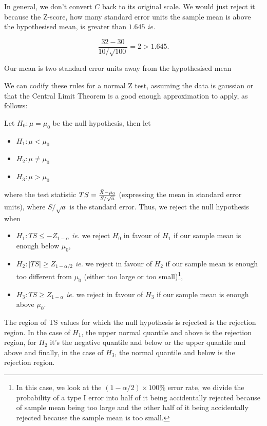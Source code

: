 \documentclass{homework}
\begin{document}
In general, we don't convert $C$ back to its original scale. We would just reject it because the Z-score, how many standard error units the sample mean is above the hypothesised mean, is greater than $1.645$ \textit{ie. }

$$
\frac{32-30}{10/\sqrt{100}} = 2 > 1.645.
$$

Our mean is two standard error units away from the hypothesised mean 

We can codify these rules for a normal Z test, assuming the data is gaussian or that the Central Limit Theorem is a good enough approximation to apply, as follows:

Let $H_0 : \mu = \mu_0$ be the null hypothesis, then let 
\begin{itemize}
    \item $H_1: \mu < \mu_0$
    \item $H_2: \mu \neq \mu_0$
    \item $H_3: \mu > \mu_0$
\end{itemize}

where the test statistic $TS = \frac{\Bar{X}-\mu_0}{S/\sqrt{a}}$ (expressing the mean in standard error units), where $S/\sqrt{a}$ is the standard error. Thus, we reject the null hypothesis when 

\begin{itemize}
\item $H_1: TS \leq -Z_{1-\alpha}$ \textit{ie.} we reject $H_0$ in favour of $H_1$ if our sample mean is enough below $\mu_0$,
    \item $H_2: |TS| \geq  Z_{1-\alpha/2}$ \textit{ie.} we reject in favour of $H_2$ if our sample mean is enough too different from $\mu_0$ (either too large or too small)\footnote{In this case, we look at the $(1-\alpha/2)\times 100\%$ error rate, we divide the probability of a type I error into half of it being accidentally rejected because of sample mean being too large and the other half of it being accidentally rejected because the sample mean is too small. }, 
    \item $H_3: TS \geq Z_{1-\alpha}$ \textit{ie.} we reject in favour of $H_3$ if our sample mean is enough above $\mu_0$.
\end{itemize}

The region of TS values for which the null hypothesis is rejected is the rejection region. In the case of $H_1$, the upper normal quantile and above is the rejection region, for $H_2$ it's the negative quantile and below or the upper quantile and above and finally, in the case of $H_3$, the normal quantile and below is the rejection region.
\end{document}
